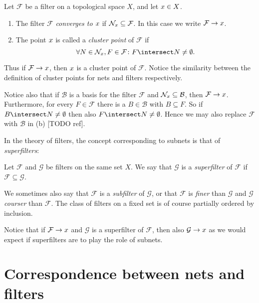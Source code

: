 \documentclass[article, a4paper, 11pt, oneside]{memoir}
\numberwithin{equation}{chapter}
\newcommand{\calB}{\mathcal{B}}
\newcommand{\calF}{\mathcal{F}}
\newcommand{\calG}{\mathcal{G}}
\theoremstyle{nonumberplain}
\begin{document}
\begin{definition}
    Let $\calF$ be a filter on a topological space $X$, and let $x \in X$.
    \begin{enumerate}
        \item The filter $\calF$ \emph{converges to $x$} if $\nhoods{\mylimit} \subseteq \calF$. In this case we write $\calF \to \mylimit$.
        
        \item The point $x$ is called a \emph{cluster point} of $\calF$ if
        \begin{equation*}
            \forall N \in \nhoods{\mylimit}, F \in \calF \colon F \intersect N \neq \emptyset.
        \end{equation*}
    \end{enumerate}
\end{definition}
%
Thus if $\calF \to \mylimit$, then $x$ is a cluster point of $\calF$. Notice the similarity between the definition of cluster points for nets and filters respectively.

\begin{remark}
    \label{rem:filter-cluster-points}
    Notice also that if $\calB$ is a basis for the filter $\calF$ and $\nhoods{\mylimit} \subseteq \calB$, then $\calF \to \mylimit$. Furthermore, for every $F \in \calF$ there is a $B \in \calB$ with $B \subseteq F$. So if $B \intersect N \neq \emptyset$ then also $F \intersect N \neq \emptyset$. Hence we may also replace $\calF$ with $\calB$ in (b) [TODO ref].
\end{remark}

In the theory of filters, the concept corresponding to subnets is that of \emph{superfilters}:

\begin{definition}[Superfilters]
    Let $\calF$ and $\calG$ be filters on the same set $X$. We say that $\calG$ is a \emph{superfilter} of $\calF$ if $\calF \subseteq \calG$.
\end{definition}
%
We sometimes also say that $\calF$ is a \emph{subfilter} of $\calG$, or that $\calF$ is \emph{finer} than $\calG$ and $\calG$ \emph{courser} than $\calF$. The class of filters on a fixed set is of course partially ordered by inclusion.

Notice that if $\calF \to \mylimit$ and $\calG$ is a superfilter of $\calF$, then also $\calG \to \mylimit$ as we would expect if superfilters are to play the role of subnets.


\chapter{Correspondence between nets and filters}
\end{document}
